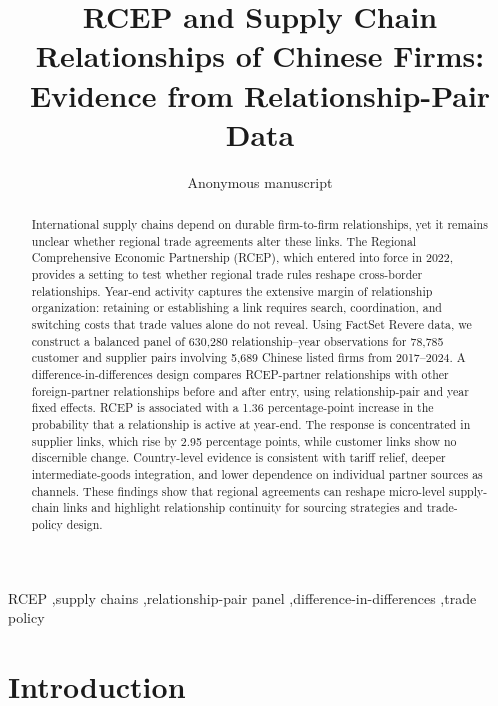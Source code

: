 \documentclass[preprint,12pt,authoryear]{elsarticle}
\begin{document}
\begin{frontmatter}

\title{RCEP and Supply Chain Relationships of Chinese Firms: Evidence from Relationship-Pair Data}

\author{Anonymous manuscript}

\begin{abstract}
International supply chains depend on durable firm-to-firm relationships, yet it remains unclear whether regional trade agreements alter these links. The Regional Comprehensive Economic Partnership (RCEP), which entered into force in 2022, provides a setting to test whether regional trade rules reshape cross-border relationships. Year-end activity captures the extensive margin of relationship organization: retaining or establishing a link requires search, coordination, and switching costs that trade values alone do not reveal. Using FactSet Revere data, we construct a balanced panel of 630,280 relationship--year observations for 78,785 customer and supplier pairs involving 5,689 Chinese listed firms from 2017--2024. A difference-in-differences design compares RCEP-partner relationships with other foreign-partner relationships before and after entry, using relationship-pair and year fixed effects. RCEP is associated with a 1.36 percentage-point increase in the probability that a relationship is active at year-end. The response is concentrated in supplier links, which rise by 2.95 percentage points, while customer links show no discernible change. Country-level evidence is consistent with tariff relief, deeper intermediate-goods integration, and lower dependence on individual partner sources as channels. These findings show that regional agreements can reshape micro-level supply-chain links and highlight relationship continuity for sourcing strategies and trade-policy design.
\end{abstract}

\begin{keyword}
RCEP \sep supply chains \sep relationship-pair panel \sep difference-in-differences \sep trade policy
\end{keyword}

\end{frontmatter}

\section{Introduction}
\label{sec:introduction}
\end{document}
